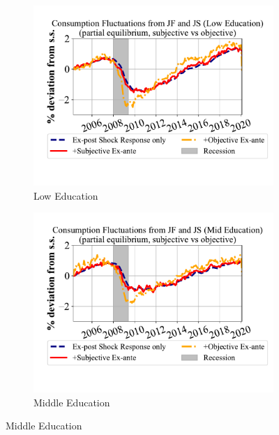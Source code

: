   \begin{figure}[ht]
    \centering
    \caption{\textbf{Monthly} Consumption Fluctuations due to Unemployment Risks: by Education}
    \label{fig:pe_decompose_sub_obj_educ_monthly}

    \begin{subfigure}{0.32\linewidth}
     \caption*{Low Education}
        \includegraphics[width=\linewidth]{Figures/consumption_pe_JS_JF_deviation_machine_as_rational_LowEdu_monthly.pdf}
       
    \end{subfigure}
    \hfill
    \begin{subfigure}{0.32\linewidth}
     \caption*{Middle Education}
        \includegraphics[width=\linewidth]{Figures/consumption_pe_JS_JF_deviation_machine_as_rational_MidEdu_monthly.pdf}
       

\end{subfigure}
\end{figure}
